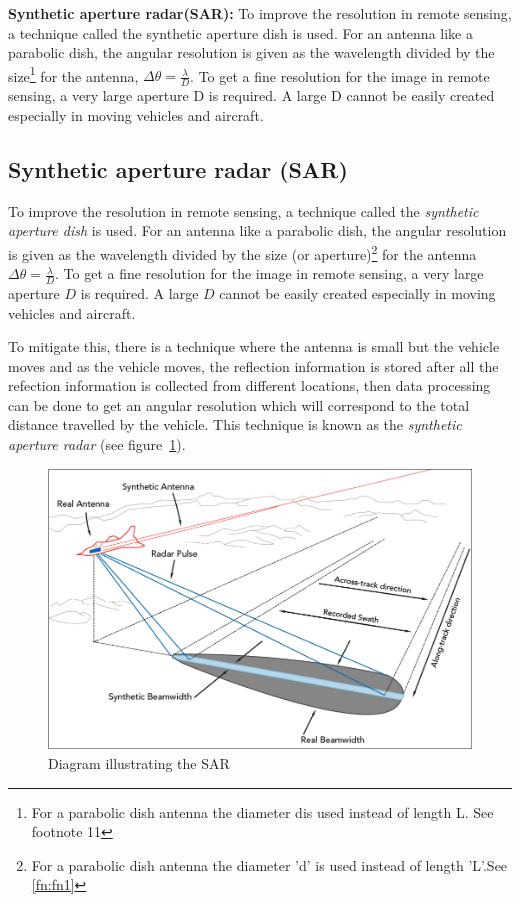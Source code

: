 \textbf{Synthetic aperture radar(SAR):} To improve the resolution in remote sensing, a technique called the synthetic aperture dish is used. For an antenna like a parabolic dish, the angular resolution is given as the wavelength divided by the size\footnote{For a parabolic dish antenna the diameter \textquotesingle d\textquotesingle is used instead of length \textquotesingle L\textquotesingle. See footnote 11} for the antenna, $\Delta \theta = \frac{\lambda}{D}$. To get a fine resolution for the image in remote sensing, a very large aperture D is required. A large D cannot be easily created especially in moving vehicles and aircraft.\\

\subsection{Synthetic aperture radar (SAR)}
To improve the resolution in remote sensing, a technique called the \textit{synthetic aperture dish} is used. For an antenna like a parabolic dish, the angular resolution is given as the wavelength divided by the size (or aperture)\footnote{For a parabolic dish antenna the diameter 'd' is used instead of length 'L'.See \autoref{fn:fn1}} for the antenna $\Delta \theta = \frac{\lambda}{D}$. To get a fine resolution for the image in remote sensing, a very large aperture $D$ is required. A large $D$ cannot be easily created especially in moving vehicles and aircraft.

To mitigate this, there is a technique where the antenna is small but the vehicle moves and as the vehicle moves, the reflection information is stored after all the refection information is collected from different locations, then data processing can be done to get an angular resolution which will correspond to the total distance travelled by the vehicle. This technique is known as the \textit{synthetic aperture radar} (see figure~\ref{fig:sar2}).
\begin{figure}[h]
\centering
\includegraphics[scale=0.3]{./graphics/sar2}
\caption{Diagram illustrating the SAR}
\label{fig:sar2}
\end{figure}

